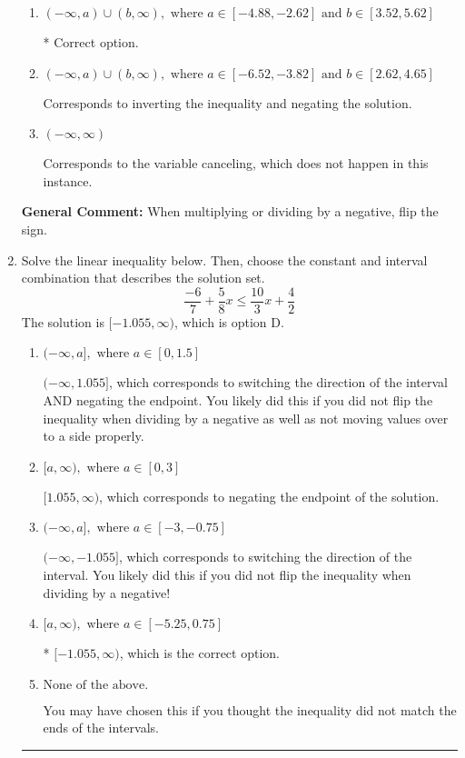 \documentclass{extbook}[14pt]
\newcommand{\litem}[1]{\item #1

\rule{\textwidth}{0.4pt}}
\begin{document}
\begin{enumerate}
{\begin{enumerate}[label=\Alph*.]
Corresponds to including the endpoints (when they should be excluded).
\item \( (-\infty, a) \cup (b, \infty), \text{ where } a \in [-4.88, -2.62] \text{ and } b \in [3.52, 5.62] \)

 * Correct option.
\item \( (-\infty, a) \cup (b, \infty), \text{ where } a \in [-6.52, -3.82] \text{ and } b \in [2.62, 4.65] \)

Corresponds to inverting the inequality and negating the solution.
\item \( (-\infty, \infty) \)

Corresponds to the variable canceling, which does not happen in this instance.
\end{enumerate}

\textbf{General Comment:} When multiplying or dividing by a negative, flip the sign.
}
\litem{
Solve the linear inequality below. Then, choose the constant and interval combination that describes the solution set.
\[ \frac{-6}{7} + \frac{5}{8} x \leq \frac{10}{3} x + \frac{4}{2} \]The solution is \( [-1.055, \infty) \), which is option D.\begin{enumerate}[label=\Alph*.]
\item \( (-\infty, a], \text{ where } a \in [0, 1.5] \)

 $(-\infty, 1.055]$, which corresponds to switching the direction of the interval AND negating the endpoint. You likely did this if you did not flip the inequality when dividing by a negative as well as not moving values over to a side properly.
\item \( [a, \infty), \text{ where } a \in [0, 3] \)

 $[1.055, \infty)$, which corresponds to negating the endpoint of the solution.
\item \( (-\infty, a], \text{ where } a \in [-3, -0.75] \)

 $(-\infty, -1.055]$, which corresponds to switching the direction of the interval. You likely did this if you did not flip the inequality when dividing by a negative!
\item \( [a, \infty), \text{ where } a \in [-5.25, 0.75] \)

* $[-1.055, \infty)$, which is the correct option.
\item \( \text{None of the above}. \)

You may have chosen this if you thought the inequality did not match the ends of the intervals.
\end{enumerate}

}
\end{enumerate}
\end{document}
